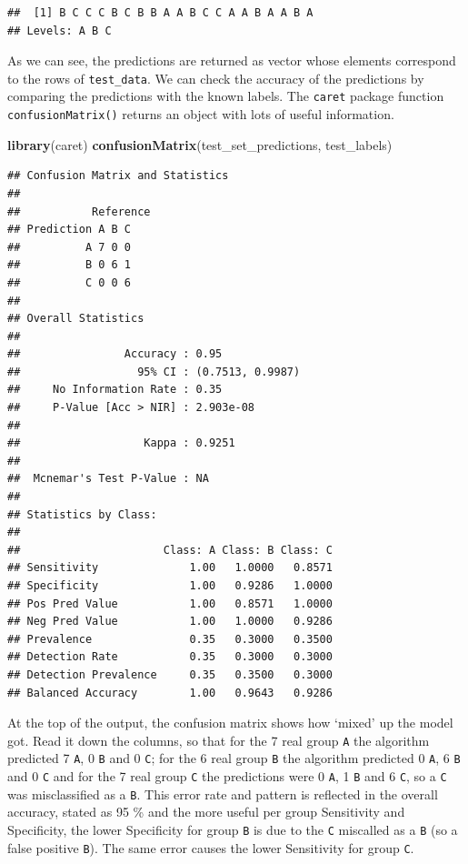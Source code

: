 \documentclass[
]{book}
\newenvironment{Shaded}{\begin{snugshade}}{\end{snugshade}}
\newcommand{\KeywordTok}[1]{\textcolor[rgb]{0.13,0.29,0.53}{\textbf{#1}}}
\newcommand{\NormalTok}[1]{#1}
\begin{document}
\begin{verbatim}
##  [1] B C C C B C B B A A B C C A A B A A B A
## Levels: A B C
\end{verbatim}

As we can see, the predictions are returned as vector whose elements correspond to the rows of \texttt{test\_data}. We can check the accuracy of the predictions by comparing the predictions with the known labels. The \texttt{caret} package function \texttt{confusionMatrix()} returns an object with lots of useful information.

\begin{Shaded}
\begin{Highlighting}[]
\KeywordTok{library}\NormalTok{(caret)}
\KeywordTok{confusionMatrix}\NormalTok{(test_set_predictions, test_labels)}
\end{Highlighting}
\end{Shaded}

\begin{verbatim}
## Confusion Matrix and Statistics
## 
##           Reference
## Prediction A B C
##          A 7 0 0
##          B 0 6 1
##          C 0 0 6
## 
## Overall Statistics
##                                           
##                Accuracy : 0.95            
##                  95% CI : (0.7513, 0.9987)
##     No Information Rate : 0.35            
##     P-Value [Acc > NIR] : 2.903e-08       
##                                           
##                   Kappa : 0.9251          
##                                           
##  Mcnemar's Test P-Value : NA              
## 
## Statistics by Class:
## 
##                      Class: A Class: B Class: C
## Sensitivity              1.00   1.0000   0.8571
## Specificity              1.00   0.9286   1.0000
## Pos Pred Value           1.00   0.8571   1.0000
## Neg Pred Value           1.00   1.0000   0.9286
## Prevalence               0.35   0.3000   0.3500
## Detection Rate           0.35   0.3000   0.3000
## Detection Prevalence     0.35   0.3500   0.3000
## Balanced Accuracy        1.00   0.9643   0.9286
\end{verbatim}

At the top of the output, the confusion matrix shows how `mixed' up the model got. Read it down the columns, so that for the 7 real group \texttt{A} the algorithm predicted 7 \texttt{A}, 0 \texttt{B} and 0 \texttt{C}; for the 6 real group \texttt{B} the algorithm predicted 0 \texttt{A}, 6 \texttt{B} and 0 \texttt{C} and for the 7 real group \texttt{C} the predictions were 0 \texttt{A}, 1 \texttt{B} and 6 \texttt{C}, so a \texttt{C} was misclassified as a \texttt{B}. This error rate and pattern is reflected in the overall accuracy, stated as 95 \% and the more useful per group Sensitivity and Specificity, the lower Specificity for group \texttt{B} is due to the \texttt{C} miscalled as a \texttt{B} (so a false positive \texttt{B}). The same error causes the lower Sensitivity for group \texttt{C}.
\end{document}
